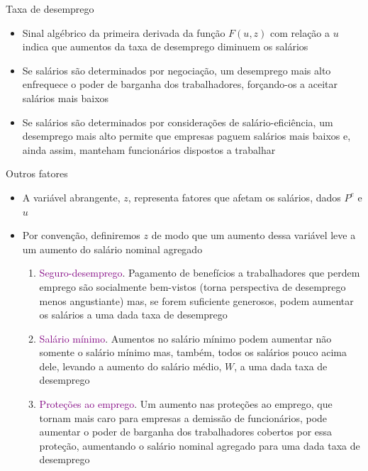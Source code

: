 \documentclass[10pt]{beamer}
\begin{document}
\begin{frame}
    {Taxa de desemprego}
    \begin{itemize}
        \item Sinal algébrico da primeira derivada da função $F(u,z)$ com relação a $u$ indica que aumentos da taxa de desemprego diminuem os salários\bigskip
        \item Se salários são determinados por negociação, um desemprego mais alto enfrequece o poder de barganha dos trabalhadores, forçando-os a aceitar salários mais baixos\bigskip
        \item Se salários são determinados por considerações de salário-eficiência, um desemprego mais alto permite que empresas paguem salários mais baixos e, ainda assim, manteham funcionários dispostos a trabalhar
    \end{itemize}
\end{frame}

\begin{frame}
    {Outros fatores}
    \begin{itemize}
        \item A variável abrangente, $z$, representa fatores que afetam os salários, dados $P^e$ e $u$\bigskip
        \item Por convenção, definiremos $z$ de modo que um aumento dessa variável leve a um aumento do salário nominal agregado\bigskip
        \begin{enumerate}
            \item \textcolor{purple}{Seguro-desemprego}. Pagamento de benefícios a trabalhadores que perdem emprego são socialmente bem-vistos (torna perspectiva de desemprego menos angustiante) mas, se forem suficiente generosos, podem aumentar os salários a uma dada taxa de desemprego\medskip
            \item \textcolor{purple}{Salário mínimo}. Aumentos no salário mínimo podem aumentar não somente o salário mínimo mas, também, todos os salários pouco acima dele, levando a aumento do salário médio, $W$, a uma dada taxa de desemprego\medskip
            \item \textcolor{purple}{Proteções ao emprego}. Um aumento nas proteções ao emprego, que tornam mais caro para empresas a demissão de funcionários, pode aumentar o poder de barganha dos trabalhadores cobertos por essa proteção, aumentando o salário nominal agregado para uma dada taxa de desemprego
        \end{enumerate}
    \end{itemize}
\end{frame}
\end{document}
